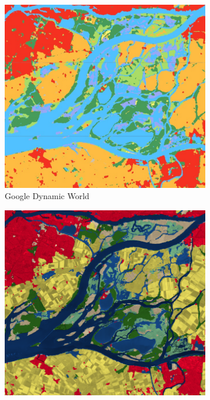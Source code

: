 \begin{figure}[H]
    \vspace{1em} %

    \begin{subfigure}[b]{0.48\textwidth} %
    \centering
    \includegraphics[width=0.99\textwidth,height=0.99\textwidth]{figs_01/a_dynamicworld.png}
    \caption{Google Dynamic World}
    \label{fig:lc_dynamicworld}
    \end{subfigure}
    \hfill %
    \begin{subfigure}[b]{0.48\textwidth} %
    \centering
    \includegraphics[width=0.99\textwidth,height=0.99\textwidth]{figs_01/a_esri.png}

\end{subfigure}
\end{figure}
